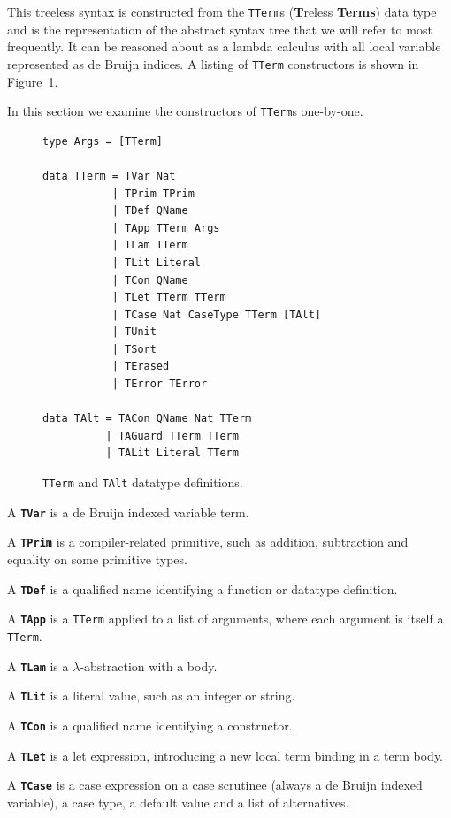 This treeless syntax is constructed from the \lstinline{TTerm}s (\textbf{T}reless \textbf{Terms}) data type and is the representation of the abstract syntax tree that we will refer to most frequently. It can be reasoned about as a lambda calculus with all local variable represented as de Bruijn indices. A listing of \lstinline{TTerm} constructors is shown in Figure~\ref{code:TTerm}.

In this section we examine the constructors of \lstinline{TTerm}s one-by-one.\cite{agdahackage}

\begin{figure}[h]
\begin{lstlisting}[style=blockhaskell]
type Args = [TTerm]

data TTerm = TVar Nat
           | TPrim TPrim
           | TDef QName
           | TApp TTerm Args
           | TLam TTerm
           | TLit Literal
           | TCon QName
           | TLet TTerm TTerm
           | TCase Nat CaseType TTerm [TAlt]
           | TUnit
           | TSort
           | TErased
           | TError TError

data TAlt = TACon QName Nat TTerm
          | TAGuard TTerm TTerm
          | TALit Literal TTerm
\end{lstlisting}
\caption{\lstinline{TTerm} and \lstinline{TAlt} datatype definitions.}
\label{code:TTerm}
\end{figure}

A \textbf{\lstinline{TVar}} is a de Bruijn indexed variable term.

A \textbf{\lstinline{TPrim}} is a compiler-related primitive, such as addition, subtraction and equality on some primitive types.

A \textbf{\lstinline{TDef}} is a qualified name identifying a function or datatype definition.

A \textbf{\lstinline{TApp}} is a \lstinline{TTerm} applied to a list of arguments, where each argument is itself a \lstinline{TTerm}.

A \textbf{\lstinline{TLam}} is a $\lambda$-abstraction with a body.

A \textbf{\lstinline{TLit}} is a literal value, such as an integer or string.

A \textbf{\lstinline{TCon}} is a qualified name identifying a constructor.

A \textbf{\lstinline{TLet}} is a let expression, introducing a new local term binding in a term body.

A \textbf{\lstinline{TCase}} is a case expression on a case scrutinee (always a de Bruijn indexed variable), a case type, a default value and a list of alternatives.

